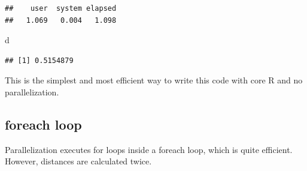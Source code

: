 \documentclass[
  12pt,
  american,
  a4paper,
  extrafontsizes,onecolumn,openright
  ]{memoir}
\newenvironment{Shaded}{\begin{snugshade}}{\end{snugshade}}
\newcommand{\AttributeTok}[1]{\textcolor[rgb]{0.13,0.29,0.53}{#1}}
\newcommand{\ControlFlowTok}[1]{\textcolor[rgb]{0.13,0.29,0.53}{\textbf{#1}}}
\newcommand{\DecValTok}[1]{\textcolor[rgb]{0.00,0.00,0.81}{#1}}
\newcommand{\FunctionTok}[1]{\textcolor[rgb]{0.13,0.29,0.53}{\textbf{#1}}}
\newcommand{\NormalTok}[1]{#1}
\newcommand{\OtherTok}[1]{\textcolor[rgb]{0.56,0.35,0.01}{#1}}
\newcommand{\SpecialCharTok}[1]{\textcolor[rgb]{0.81,0.36,0.00}{\textbf{#1}}}
\newcommand{\StringTok}[1]{\textcolor[rgb]{0.31,0.60,0.02}{#1}}
\begin{document}
\begin{verbatim}
##    user  system elapsed 
##   1.069   0.004   1.098
\end{verbatim}

\begin{Shaded}
\begin{Highlighting}[]
\NormalTok{d}
\end{Highlighting}
\end{Shaded}

\begin{verbatim}
## [1] 0.5154879
\end{verbatim}

\normalsize

This is the simplest and most efficient way to write this code with core R and no parallelization.

\subsection{foreach loop}\label{foreach-loop}

Parallelization executes for loops inside a foreach loop, which is quite efficient.
However, distances are calculated twice.

\scriptsize

\begin{Shaded}
\end{Shaded}
\end{document}

